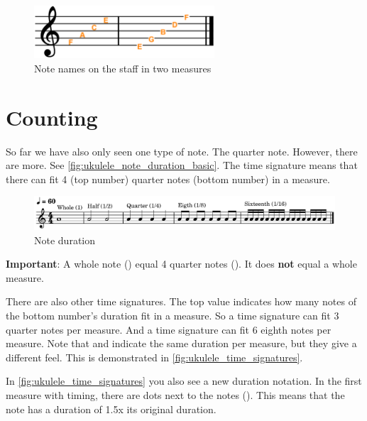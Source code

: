 \begin{figure}[h]
	\centering
	\includegraphics[width=0.6\textwidth]{../../Images/MusicNotation_MeasureNoteNames.png}
	\caption{Note names on the staff in two measures}
	\label{fig:ukulele_music_note_names_on_staff}
\end{figure}

\newpage

\section{Counting}

So far we have also only seen one type of note. The quarter note. However, there are more. See \autoref{fig:ukulele_note_duration_basic}. The  time signature means that there can fit 4 (top number) quarter notes (bottom number) in a measure. 

\begin{figure}[h]
	\centering
	\includegraphics[width=\textwidth]{../../MuseScore/Ukulele/MusicNotation/NoteDurations_Basic.png}
	\caption{Note duration}
	\label{fig:ukulele_note_duration_basic}
\end{figure}

\textbf{Important}: A whole note (\wholeNote) equal 4 quarter notes (\quarterNote). It does \textbf{not} equal a whole measure. \newline

There are also other time signatures. The top value indicates how many notes of the bottom number's duration fit in a measure. So a  time signature can fit 3 quarter notes per measure. And a  time signature can fit 6 eighth notes per measure. Note that  and  indicate the same duration per measure, but they give a different feel. This is demonstrated in \autoref{fig:ukulele_time_signatures}.

In \autoref{fig:ukulele_time_signatures} you also see a new duration notation. In the first measure with  timing, there are dots next to the notes (\quarterNoteDottedDown). This means that the note has a duration of 1.5x its original duration.

